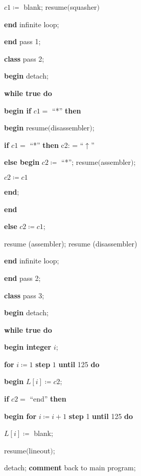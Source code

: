 \quad \quad \quad \quad $c1\coloneq$ blank; resume$($squasher$)$

\quad \quad \quad \textbf{end} infinite loop;

\quad \textbf{end} pass 1;

\quad \textbf{class} pass 2;

\quad \textbf{begin} detach;

\quad \quad \textbf{while true do}

\quad \quad \quad \textbf{begin if} $c1 =$ ``*'' \textbf{then}

\quad \quad \quad \quad \textbf{begin} resume$($disassembler$)$;

\quad \quad \quad \quad \quad \textbf{if} $c1 =$ ``*'' \textbf{then} c2: = ``$\uparrow$''

\quad \quad \quad \quad \quad \textbf{else begin} $c2 \coloneq$ ``*''; resume$($assembler$)$;

\quad \quad \quad \quad \quad \quad $c2\coloneq c1$

\quad \quad \quad \quad \quad \textbf{end};

\quad \quad \quad \quad \textbf{end}

\quad \quad \quad \textbf{else} $c2\coloneq c1$;

\quad \quad \quad resume (assembler); resume (disassembler)

\quad \textbf{end} infinite loop;

\quad \textbf{end} pass 2;

\quad \textbf{class} pass 3;

\quad \textbf{begin} detach;

\quad \quad \textbf{while true do}

\quad \quad \quad \textbf{begin integer} $i$;

\quad \quad \quad \quad \textbf{for} $i\coloneq 1$ \textbf{step} $1$ \textbf{until} 125 \textbf{do}

\quad \quad \quad \quad \quad \textbf{begin} $L[i] \coloneq c2$;

\quad \quad \quad \quad \quad \quad \textbf{if} $c2 =$ ``end'' \textbf{then}

\quad \quad \quad \quad \quad \quad \textbf{begin for} $i\coloneq i + 1$ \textbf{step} 1 \textbf{until} 125 \textbf{do}

\quad \quad \quad \quad \quad \quad \quad $L[i] \coloneq$ blank;

\quad \quad \quad \quad \quad \quad \quad resume$($lineout$)$;

\quad \quad \quad \quad \quad \quad \quad detach; \textbf{comment} back to main program;

